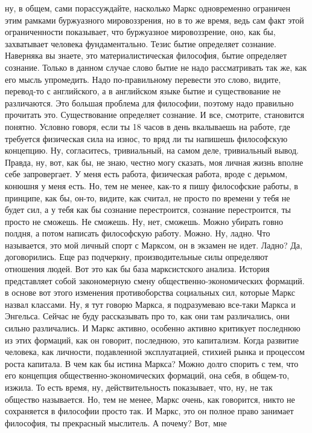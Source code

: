 ну, в общем, сами порассуждайте, насколько Маркс одновременно ограничен этим
рамками буржуазного мировоззрения, но в то же время, ведь сам факт этой
ограниченности показывает, что буржуазное мировоззрение, оно, как бы,
захватывает человека фундаментально. Тезис бытие определяет сознание. Наверняка
вы знаете, это материалистическая философия, бытие определяет сознание. Только в
данном случае слово бытие не надо рассматривать так же, как его мысль
упромедить. Надо по-правильному перевести это слово, видите, перевод-то с
английского, а в английском языке бытие и существование не различаются. Это
большая проблема для философии, поэтому надо правильно прочитать это.
Существование определяет сознание. И все, смотрите, становится понятно. Условно
говоря, если ты 18 часов в день вкалываешь на работе, где требуется физическая
сила на износ, то вряд ли ты напишешь философскую концепцию. Ну, согласитесь,
тривиальный, на самом деле, тривиальный вывод. Правда, ну, вот, как бы, не знаю,
честно могу сказать, моя личная жизнь вполне себе запровергает. У меня есть
работа, физическая работа, вроде с дерьмом, конюшня у меня есть. Но, тем не
менее, как-то я пишу философские работы, в принципе, как бы, он-то, видите, как
считал, не просто по времени у тебя не будет сил, а у тебя как бы сознание
перестроится, сознание перестроится, ты просто не сможешь. Не сможешь. Ну, нет,
сможешь. Можно убирать говно полдня, а потом написать философскую работу. Можно.
Ну, ладно. Что называется, это мой личный спорт с Марксом, он в экзамен не идет.
Ладно? Да, договорились. Еще раз подчеркну, производительные силы определяют
отношения людей. Вот это как бы база марксистского анализа. История представляет
собой закономерную смену общественно-экономических формаций. в основе вот этого
изменения противоборства социальных сил, которые Маркс назвал классами. Ну, я
тут говорю Маркса, я подразумеваю все-таки Маркса и Энгельса. Сейчас не буду
рассказывать про то, как они там различались, они сильно различались. И Маркс
активно, особенно активно критикует последнюю из этих формаций, как он говорит,
последнюю, это капитализм. Когда развитие человека, как личности, подавленной
эксплуатацией, стихией рынка и процессом роста капитала. В чем как бы истина
Маркса? Можно долго спорить с тем, что его концепция общественно-экономических
формаций, она себя, в общем-то, изжила. То есть время, ну, действительность
показывает, что, ну, не так общество называется. Но, тем не менее, Маркс очень,
как говорится, никто не сохраняется в философии просто так. И Маркс, это он
полное право занимает философия, ты прекрасный мыслитель. А почему? Вот, мне
